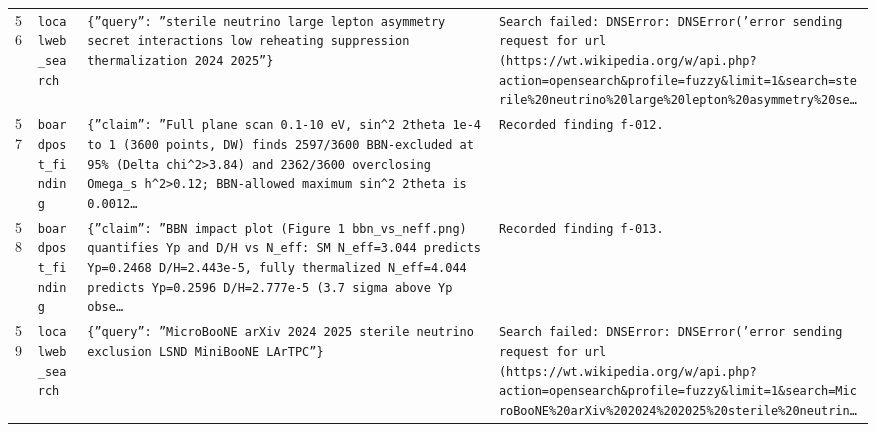 \documentclass[11pt,a4paper]{article}
\begin{document}
\begin{longtable}{@{}p{}p{}p{}p{}@{}}
56 & \texttt{local}\newline\texttt{web\_\allowbreak{}search} & \texttt{\{''query'':\allowbreak{} ''sterile neutrino large lepton asymmetry secret interactions low reheating suppression thermalization 2024 2025''\}\allowbreak{}} & \texttt{Search failed:\allowbreak{} DNSError:\allowbreak{} DNSError('error sending request for url (https:\allowbreak{}/\allowbreak{}/\allowbreak{}wt.wikipedia.org/\allowbreak{}w/\allowbreak{}api.php?action=\allowbreak{}opensearch\&profile=\allowbreak{}fuzzy\&limit=\allowbreak{}1\&search=\allowbreak{}sterile\%20neutrino\%20large\%20lepton\%20asymmetry\%20se\ldots{}\allowbreak{}} \\
57 & \texttt{board}\newline\texttt{post\_\allowbreak{}finding} & \texttt{\{''claim'':\allowbreak{} ''Full plane scan 0.1-10 eV,\allowbreak{} sin\textasciicircum{}\allowbreak{}2 2theta 1e-4 to 1 (3600 points,\allowbreak{} DW)\allowbreak{} finds 2597/\allowbreak{}3600 BBN-excluded at 95\% (Delta chi\textasciicircum{}\allowbreak{}2\textgreater{}\allowbreak{}3.84)\allowbreak{} and 2362/\allowbreak{}3600 overclosing Omega\_\allowbreak{}s h\textasciicircum{}\allowbreak{}2\textgreater{}\allowbreak{}0.12;\allowbreak{} BBN-allowed maximum sin\textasciicircum{}\allowbreak{}2 2theta is 0.0012\ldots{}\allowbreak{}} & \texttt{Recorded finding f-012.} \\
58 & \texttt{board}\newline\texttt{post\_\allowbreak{}finding} & \texttt{\{''claim'':\allowbreak{} ''BBN impact plot (Figure 1 bbn\_\allowbreak{}vs\_\allowbreak{}neff.png)\allowbreak{} quantifies Yp and D/\allowbreak{}H vs N\_\allowbreak{}eff:\allowbreak{} SM N\_\allowbreak{}eff=\allowbreak{}3.044 predicts Yp=\allowbreak{}0.2468 D/\allowbreak{}H=\allowbreak{}2.443e-5,\allowbreak{} fully thermalized N\_\allowbreak{}eff=\allowbreak{}4.044 predicts Yp=\allowbreak{}0.2596 D/\allowbreak{}H=\allowbreak{}2.777e-5 (3.7 sigma above Yp obse\ldots{}\allowbreak{}} & \texttt{Recorded finding f-013.} \\
59 & \texttt{local}\newline\texttt{web\_\allowbreak{}search} & \texttt{\{''query'':\allowbreak{} ''MicroBooNE arXiv 2024 2025 sterile neutrino exclusion LSND MiniBooNE LArTPC''\}\allowbreak{}} & \texttt{Search failed:\allowbreak{} DNSError:\allowbreak{} DNSError('error sending request for url (https:\allowbreak{}/\allowbreak{}/\allowbreak{}wt.wikipedia.org/\allowbreak{}w/\allowbreak{}api.php?action=\allowbreak{}opensearch\&profile=\allowbreak{}fuzzy\&limit=\allowbreak{}1\&search=\allowbreak{}MicroBooNE\%20arXiv\%202024\%202025\%20sterile\%20neutrin\ldots{}\allowbreak{}} \\

\end{longtable}
\end{document}
